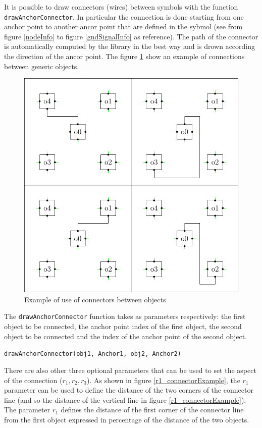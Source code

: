 \documentclass[a4paper,12pt]{report}
\begin{document}
It is possible to draw connectors (wires) between symbols with the function \texttt{drawAnchorConnector}. In particular the connection is done starting from one anchor point to another ancor point that are defined in the sybmol (see from figure \ref{nodeInfo} to figure \ref{gndSignalInfo} as reference). The path of the connector is automatically computed by the library in the best way and is drown according the direction of the ancor point. The figure \ref{connectorExample} show an example of connections between generic objects.

\begin{figure}[ht]
  \centering
  \includegraphics[width=1.0\textwidth]{N-S}
  \caption{Example of use of connectors between objects}
  \label{connectorExample}
\end{figure}

The \texttt{drawAnchorConnector} function takes as parameters respectively: the first object to be connected, the anchor point index of the first object, the second object to be connected and the index of the anchor point of the second object.

\texttt{drawAnchorConnector(obj1, Anchor1, obj2, Anchor2)}

There are also other three optional parameters that can be used to set the aspect of the connection ($r_1,r_2,r_3$). As shown in figure \ref{r1_connectorExample}, the $r_1$ parameter can be used to define the distance of the two corners of the connector line (and so the distance of the vertical line in figure \ref{r1_connectorExample}). The parameter $r_1$ defines the distance of the first corner of the connector line from the first object expressed in percentage of the distance of the two objects.
\end{document}

